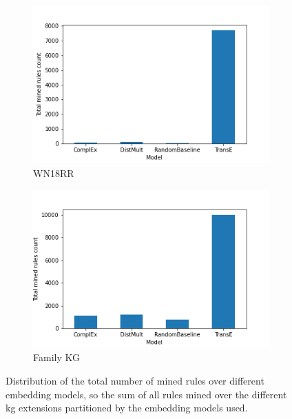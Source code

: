\begin{figure}[htbp]
\centering
\begin{subfigure}{.5\textwidth}
  \centering
  \includegraphics[width=1\linewidth]{figures/results/Total_mined_rules-model-wn18rr.png}
  \caption{WN18RR}
  \label{total_rules_KG_embedding_dist_WN18RR}
\end{subfigure}%
\begin{subfigure}{.5\textwidth}
  \centering
  \includegraphics[width=1\linewidth]{figures/results/Total_mined_rules-model-family.png}
  \caption{Family KG}
  \label{total_rules_KG_embedding_dist_family}
\end{subfigure}
\caption[Number of total mined rules over embedding models]{Distribution of the total number of mined rules over different embedding models, so the sum of all rules mined over the different \gls{kg} extensions partitioned by the embedding models used.}
\label{total_rules_KG_embedding_dist}
\end{figure}

